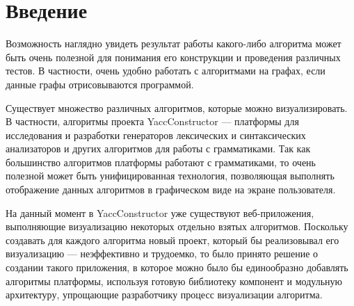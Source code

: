 \documentclass[14pt]{matmex-diploma-custom}
\begin{document}
\maketitle
\tableofcontents
\section*{Введение}
Возможность наглядно увидеть результат работы какого-либо алгоритма может быть очень полезной для понимания его конструкции и проведения различных тестов. В частности, очень удобно работать с алгоритмами на графах, если данные графы отрисовываются программой. 

Существует множество различных алгоритмов, которые можно визуализировать. В частности, алгоритмы проекта YaccConstructor --- платформы для исследования и разработки генераторов лексических и синтаксических анализаторов и других алгоритмов для работы с грамматиками. Так как большинство алгоритмов платформы работают с грамматиками, то очень полезной может быть унифицированная технология, позволяющая выполнять отображение данных алгоритмов в графическом виде на экране пользователя. 

На данный момент в YaccConstructor уже существуют веб-приложения, выполняющие визуализацию некоторых отдельно взятых алгоритмов. Поскольку создавать для каждого алгоритма новый проект, который бы реализовывал его визуализацию --- неэффективно и трудоемко, то было принято решение о создании такого приложения, в которое можно было бы единообразно добавлять алгоритмы платформы, используя готовую библиотеку компонент и модульную архитектуру, упрощающие разработчику процесс визуализации алгоритма. 
\end{document}
